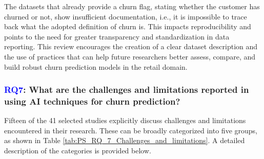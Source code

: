 \documentclass[preprint,12pt]{elsarticle}
\newcommand{\DD}[2]{\textcolor{blue}{#1}[\textcolor{red}{#2}]}
\newcommand{\RQlabel}[1]{\textcolor{blue}{#1}}
\newcommand{\RSRQseven}{\RQlabel{RQ7}: What are the challenges and limitations reported in using AI techniques for churn prediction?}
\begin{document}
The datasets that already provide a churn flag, stating whether the customer has churned or not, show insufficient documentation, i.e., it is impossible to trace back what the adopted definition of churn is. This impacts reproducibility and points to the need for greater transparency and standardization in data reporting. 
This review encourages the creation of a clear dataset description and the use of practices that can help future researchers better assess, compare, and build robust churn prediction models in the retail domain.



\subsubsection{\RSRQseven}
\label{sec:RQ7}

Fifteen of the 41 selected studies explicitly discuss challenges and limitations encountered in their research. These can be broadly categorized into five groups, as shown in Table \ref{tab:PS_RQ_7_Challenges_and_limitations}. A detailed description of the categories is provided below.
\end{document}
